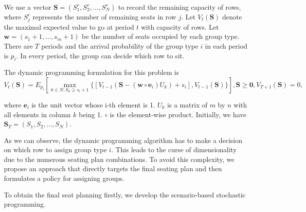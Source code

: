 We use a vector $\mathbf{S}= (S^{r}_1, S^{r}_2, \ldots, S^{r}_{N})$ to record the remaining capacity of rows, where $S^{r}_{j}$ represents the number of remaining seats in row $j$. Let $V_{t}(\mathbf{S})$ denote the maximal expected value to go at period $t$ with capacity of rows. Let $\mathbf{w} = (s_1+1, \ldots, s_m+1)$ be the number of seats occupied by each group type. There are $T$ periods and the arrival probability of the group type $i$ in each period is $p_i$. In every period, the group can decide which row to sit.

The dynamic programming formulation for this problem is
$$V_{t}(\mathbf{S}) = E_{p_i} \left[ \max_{k \in N: S_k \geq s_i +1} \{ {[V_{t-1}(\mathbf{S}- (\mathbf{w} \circ \mathbf{e}_{i})U_{k})+ s_i]}, {V_{t-1}(\mathbf{S})}\} \right], \mathbf{S} \geq \mathbf{0}, V_{T+1}(\mathbf{S}) = 0,$$

where $\mathbf{e}_{i}$ is the unit vector whose i-th element is 1. $U_k$ is a matrix of $m$ by $n$ with all elements in column $k$ being 1. $\circ$ is the element-wise product. Initially, we have $\mathbf{S}_{T} = (S_1, S_2, \ldots, S_{N})$. 


As we can observe, the dynamic programming algorithm has to make a decision on which row to assign group type $i$. This leads to the curse of dimensionality due to the numerous seating plan combinations. To avoid this complexity, we propose an approach that directly targets the final seating plan and then formulates a policy for assigning groups.

To obtain the final seat planning firstly, we develop the scenario-based stochastic programming.








